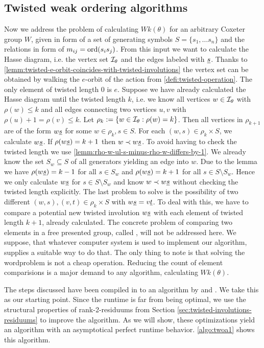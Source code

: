 \subsection{Twisted weak ordering algorithms}
\label{sec:twisted-involutions-algorithms}

Now we address the problem of calculating $Wk(\theta)$ for an arbitrary Coxeter group $W$, given in form of a set of generating symbols $S = \{s_1, \ldots s_n\}$ and the relations in form of $m_{ij} = \operatorname{ord}(s_i s_j)$. From this input we want to calculate the Hasse diagram, i.e. the vertex set $\mathcal{I}_{\theta}$ and the edges labeled with $\underline{s}$. Thanks to \ref{lemm:twisted-e-orbit-coincides-with-twisted-involutions} the vertex set can be obtained by walking the $e$-orbit of the action from \ref{defi:twisted-operation}. The only element of twisted length 0 is $e$. Suppose we have already calculated the Hasse diagram until the twisted length $k$, i.e. we know all vertices $w \in \mathcal{I}_{\theta}$ with $\rho(w) \leq k$ and all edges connecting two vertices $u,v$ with $\rho(u) + 1 = \rho(v) \leq k$. Let $\rho_k := \{ w \in \mathcal{I}_{\theta} : \rho(w) = k \}$. Then all vertices in $\rho_{k+1}$ are of the form $w \underline{s}$ for some $w \in \rho_k, s \in S$. For each $(w,s) \in \rho_k \times S$, we calculate $w \underline{s}$. If $\rho(w \underline{s}) = k + 1$ then $w \prec w \underline{s}$. To avoid having to check the twisted length we use \ref{lemm:rho-w-ul-s-minus-rho-w-differs-by-1}. We already know the set $S_w \subseteq S$ of all generators yielding an edge into $w$. Due to the lemma we have $\rho(w \underline{s}) = k - 1$ for all $s \in S_w$ and $\rho(w \underline{s}) = k + 1$ for all $s \in S \setminus S_w$. Hence we only calculate $w \underline{s}$ for $s \in S \setminus S_w$ and know $w \prec w \underline{s}$ without checking the twisted length explicitly. The last problem to solve is the possibility of two different $(w,s),(v,t) \in \rho_k \times S$ with $w \underline{s} = v \underline{t}$. To deal with this, we have to compare a potential new twisted involution $w \underline{s}$ with each element of twisted length $k+1$, already calculated. The concrete problem of comparing two elements in a free presented group, called , will not be addressed here. We suppose, that whatever computer system is used to implement our algorithm, supplies a suitable way to do that. The only thing to note is that solving the wordproblem is not a cheap operation. Reducing the count of element comparisions is a major demand to any algorithm, calculating $Wk(\theta)$.

The steps discussed have been compiled in to an algorithm by \cite[Algorithm 2.4]{brennemann:twoa} and \cite[Algorithm 3.1.1]{haas:twoa}. We take this as our starting point. Since the runtime is far from being optimal, we use the structural properties of rank-2-residuums from Section \ref{sec:twisted-involutions-residuums} to improve the algorithm. As we will show, these optimizations yield an algorithm with an asymptotical perfect runtime behavior. \ref{algo:twoa1} shows this algorithm.

